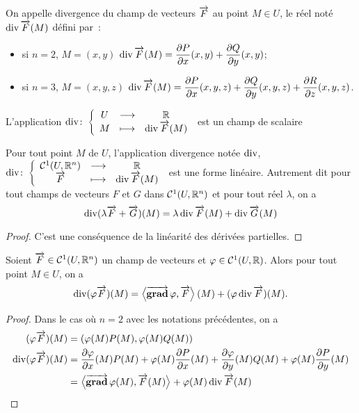 \begin{defdef}
  On appelle divergence du champ de vecteurs \(\overrightarrow{F}\) au point \(M \in U\),
  le réel noté \(\operatorname{div} \overrightarrow{F}(M)\) défini par~:
  \begin{itemize}
    \item si \(n=2\), \(M=(x,y)\) \(\operatorname{div} \overrightarrow{F}(M)=\dfrac{\partial{} P}{\partial{} x}(x,y) +
      \dfrac{\partial{} Q}{\partial{} y}(x,y)\);
    \item si \(n=3\), \(M=(x,y,z)\) \(\operatorname{div} \overrightarrow{F}(M)=\dfrac{\partial{} P}{\partial{} x}(x,y,z) +
      \dfrac{\partial{} Q}{\partial{} y}(x,y,z) + \dfrac{\partial{} R}{\partial{} z}(x,y,z)\).
  \end{itemize}
  L'application \(\operatorname{div}\colon\left\{\begin{array}{ccc}U & \longrightarrow &\mathbb{R}\\M & \longmapsto & \operatorname{div} \overrightarrow{F}(M)\end{array}\right.\) est un champ
  de scalaire
\end{defdef}
%
\begin{prop}
  Pour tout point \(M\) de \(U\), l'application divergence notée \(\operatorname{div}\),
  \(\operatorname{div}\colon\left\{\begin{array}{ccc}\mathcal{C}^{1}(U, \mathbb{R}^n) & \longrightarrow &\mathbb{R}\\\overrightarrow{F} & \longmapsto & \operatorname{div}\overrightarrow{F}(M)\end{array}\right.\)
  est une forme linéaire. Autrement dit pour tout champs de vecteurs \(F\) et
  \(G\) dans \(\mathcal{C}^{1}(U, \mathbb{R}^n)\) et pour tout réel \(\lambda\), on a
  \begin{equation}
    \operatorname{div}(\lambda \overrightarrow{F} + \overrightarrow{G})(M) = \lambda \operatorname{div} \overrightarrow{F}(M) + \operatorname{div}
    \overrightarrow{G}(M)
  \end{equation}
\end{prop}
\begin{proof}
  C'est une conséquence de la linéarité des dérivées partielles.
\end{proof}
%
\begin{prop}
  Soient \(\overrightarrow{F} \in \mathcal{C}^{1}(U, \mathbb{R}^n)\) un champ de vecteurs et \(\varphi
  \in \mathcal{C}^{1}(U, \mathbb{R})\). Alors pour tout point \(M \in U\), on a
  \begin{equation}
    \operatorname{div}(\varphi \overrightarrow{F})(M)=\left\langle{\operatorname{\overrightarrow{\mathbf{grad}}}{\varphi}},{\overrightarrow{F}}\right\rangle(M) +
    (\varphi \operatorname{div} \overrightarrow{F})(M).
  \end{equation}
\end{prop}
\begin{proof}
  Dans le cas où \(n=2\) avec les notations précédentes, on a
  \begin{align}
    (\varphi \overrightarrow{F})(M)& = (\varphi(M) P(M), \varphi(M) Q(M)) \\
    \operatorname{div}(\varphi \overrightarrow{F})(M)& = \dfrac{\partial{} \varphi}{\partial{} x}(M)  P(M) + \varphi(M)
    \dfrac{\partial{} P}{\partial{} x}(M) + \dfrac{\partial{} \varphi}{\partial{} y}(M)  Q(M) + \varphi(M)
    \dfrac{\partial{} P}{\partial{} y}(M) \\
    &=\left\langle{\operatorname{\overrightarrow{\mathbf{grad}}}{\varphi}(M)},{\overrightarrow{F}(M)}\right\rangle + \varphi(M)\operatorname{div}\overrightarrow{F}(M)
  \end{align}
\end{proof}

